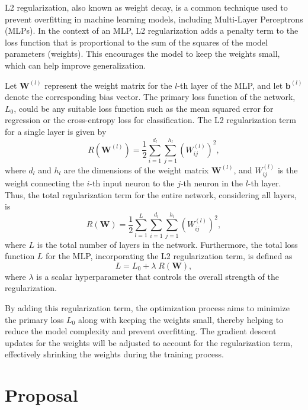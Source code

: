 L2 regularization, also known as weight decay, is a common technique used to prevent overfitting in machine learning models, including Multi-Layer Perceptrons (MLPs). In the context of an MLP, L2 regularization adds a penalty term to the loss function that is proportional to the sum of the squares of the model parameters (weights). This encourages the model to keep the weights small, which can help improve generalization.

Let $\mathbf{W}^{(l)}$ represent the weight matrix for the $l$-th layer of the MLP, and let $\mathbf{b}^{(l)}$ denote the corresponding bias vector. The primary loss function of the network, $L_0$, could be any suitable loss function such as the mean squared error for regression or the cross-entropy loss for classification. The L2 regularization term for a single layer is given by
\begin{equation}
R(\mathbf{W}^{(l)}) = \frac{1}{2} \sum_{i=1}^{d_l} \sum_{j=1}^{h_l} \left( W^{(l)}_{ij} \right)^2,
\end{equation}
where $d_l$ and $h_l$ are the dimensions of the weight matrix $\mathbf{W}^{(l)}$, and $W^{(l)}_{ij}$ is the weight connecting the $i$-th input neuron to the $j$-th neuron in the $l$-th layer. Thus, the total regularization term for the entire network, considering all layers, is
\begin{equation}
R(\mathbf{W}) = \frac{1}{2} \sum_{l=1}^{L} \sum_{i=1}^{d_l} \sum_{j=1}^{h_l} \left( W^{(l)}_{ij} \right)^2,
\end{equation}
where $L$ is the total number of layers in the network. Furthermore, the total loss function $L$ for the MLP, incorporating the L2 regularization term, is defined as
\begin{equation}
L = L_0 + \lambda \; R(\mathbf{W}),
\end{equation}
where $\lambda$ is a scalar hyperparameter that controls the overall strength of the regularization.

By adding this regularization term, the optimization process aims to minimize the primary loss $L_0$ along with keeping the weights small, thereby helping to reduce the model complexity and prevent overfitting. The gradient descent updates for the weights will be adjusted to account for the regularization term, effectively shrinking the weights during the training process.

\section{Proposal}

